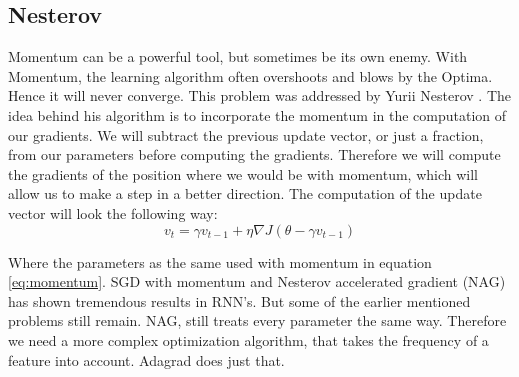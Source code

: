 \subsection{Nesterov}
Momentum can be a powerful tool, but sometimes be its own enemy. With Momentum, the learning algorithm often overshoots and blows by the  Optima. Hence it will never converge. This problem was addressed by Yurii Nesterov \cite{nesterov}. The idea behind his algorithm is to incorporate the momentum in the computation of our gradients. We will subtract the previous update vector, or just a fraction,  from our parameters before computing the gradients. Therefore we will compute the gradients of the position where we would be with momentum, which will allow us to make a step in a better direction. The computation of the update vector will look the following way:
\begin{equation}
v_t = \gamma v_{t-1} + \eta \nabla J (\theta -  \gamma v_{t-1})
\end{equation}

Where the parameters as the same used with momentum in equation \ref{eq:momentum}. SGD with momentum and Nesterov accelerated gradient (NAG) has shown tremendous results in RNN's. But some of the earlier mentioned problems still remain.  NAG, still treats every parameter the same way. Therefore we need a more complex optimization algorithm, that takes the frequency of a feature into account. Adagrad does just that. 

